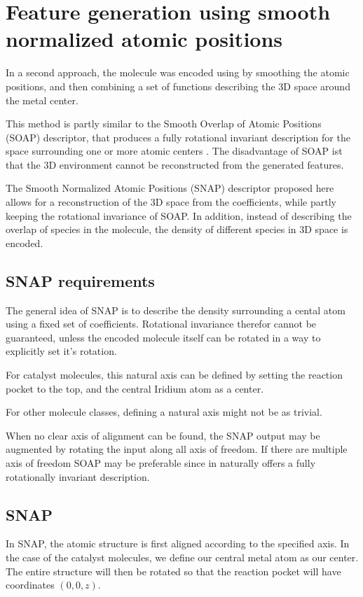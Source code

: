 \section{Feature generation using smooth normalized atomic positions}

In a second approach, the molecule was encoded using by smoothing the atomic positions, 
and then combining a set of functions describing the 3D space around the metal center.

This method is partly similar to the Smooth Overlap of Atomic Positions (SOAP) descriptor, that produces a 
fully rotational invariant description for the space surrounding one or more atomic centers \cite{Bart_k_2013}.
The disadvantage of SOAP ist that the 3D environment cannot be reconstructed from the generated features.

The Smooth Normalized Atomic Positions (SNAP) descriptor proposed here allows for a reconstruction of the 3D space from the coefficients, 
while partly keeping the rotational invariance of SOAP. 
In addition, instead of describing the overlap of species in the molecule, the
density of different species in 3D space is encoded.

\subsection{SNAP requirements}

The general idea of SNAP is to describe the density surrounding a cental atom using a fixed set of coefficients.
Rotational invariance therefor cannot be guaranteed, unless the encoded molecule itself can be rotated in a way to explicitly set it's rotation.

For catalyst molecules, this natural axis can be defined by setting the reaction pocket to the top, and the central Iridium atom as a center.

For other molecule classes, defining a natural axis might not be as trivial.

When no clear axis of alignment can be found, the SNAP output may be augmented by rotating the input along all axis of freedom.
If there are multiple axis of freedom SOAP may be preferable since in naturally offers a fully rotationally invariant description.

\subsection{SNAP}

In SNAP, the atomic structure is first aligned according to the specified axis. 
In the case of the catalyst molecules, we define our central metal atom as our center. 
The entire structure will then be rotated so that the reaction pocket will have coordinates $(0,0,z)$.

